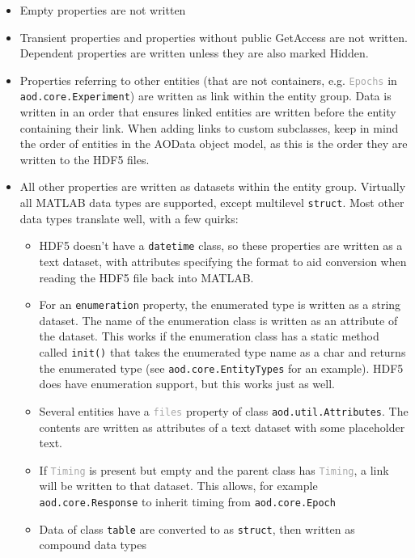 \documentclass[10pt]{exam}
\newcommand\aodclass[1]{\textcolor{codeblue}{\texttt{#1}}}
\newcommand\matclass[1]{\textcolor{codeblue}{\texttt{#1}}}
\newcommand\aodprop[1]{\textcolor{darkgray}{\texttt{#1}}}
\newcommand\aodfcn[1]{\textcolor{darkteal}{\texttt{#1}}}
\begin{document}
		\begin{itemize}
			\item Empty properties are not written
			\item Transient properties and properties without public GetAccess are not written. Dependent properties are written unless they are also marked Hidden.
			\item Properties referring to other entities (that are not containers, e.g. \aodprop{Epochs} in \aodclass{aod.core.Experiment}) are written as link within the entity group. Data is written in an order that ensures linked entities are written before the entity containing their link. When adding links to custom subclasses, keep in mind the order of entities in the AOData object model, as this is the order they are written to the HDF5 files. 
			\item All other properties are written as datasets within the entity group. Virtually all MATLAB data types are supported, except multilevel \matclass{struct}. Most other data types translate well, with a few quirks:
			\begin{itemize}
				\item HDF5 doesn't have a \matclass{datetime} class, so these properties are written as a text dataset, with attributes specifying the format to aid conversion when reading the HDF5 file back into MATLAB.
				\item For an \aodclass{enumeration} property, the enumerated type is written as a string dataset. The name of the enumeration class is written as an attribute of the dataset. This works if the enumeration class has a static method called \aodfcn{init()} that takes the enumerated type name as a char and returns the enumerated type (see \aodclass{aod.core.EntityTypes} for an example). HDF5 does have enumeration support, but this works just as well. 
				\item Several entities have a \aodprop{files} property of class \aodclass{aod.util.Attributes}. The contents are written as attributes of a text dataset with some placeholder text.
				\item If \aodprop{Timing} is present but empty and the parent class has \aodprop{Timing}, a link will be written to that dataset. This allows, for example \aodclass{aod.core.Response} to inherit timing from \aodclass{aod.core.Epoch}
				\item Data of class \matclass{table} are converted to as \aodclass{struct}, then written as compound data types

\end{itemize}
\end{itemize}
\end{document}

